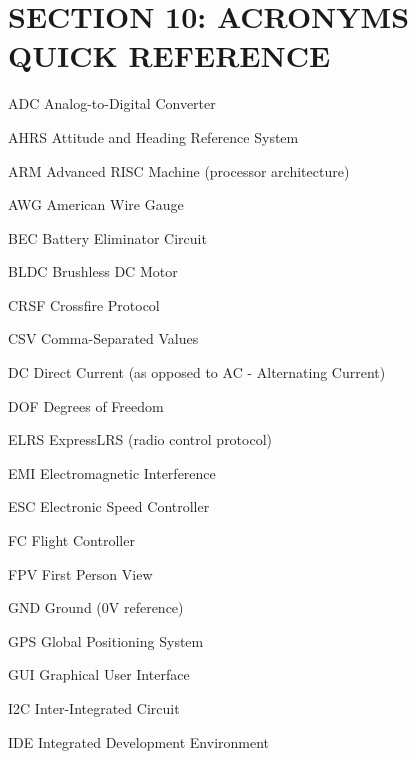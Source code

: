 \documentclass[11pt,letterpaper]{article}
\begin{document}
\section{SECTION 10: ACRONYMS QUICK REFERENCE}

ADC     Analog-to-Digital Converter\par

AHRS    Attitude and Heading Reference System\par

ARM     Advanced RISC Machine (processor architecture)\par

AWG     American Wire Gauge\par

BEC     Battery Eliminator Circuit\par

BLDC    Brushless DC Motor\par

CRSF    Crossfire Protocol\par

CSV     Comma-Separated Values\par

DC      Direct Current (as opposed to AC - Alternating Current)\par

DOF     Degrees of Freedom\par

ELRS    ExpressLRS (radio control protocol)\par

EMI     Electromagnetic Interference\par

ESC     Electronic Speed Controller\par

FC      Flight Controller\par

FPV     First Person View\par

GND     Ground (0V reference)\par

GPS     Global Positioning System\par

GUI     Graphical User Interface\par

I2C     Inter-Integrated Circuit\par

IDE     Integrated Development Environment\par
\end{document}
